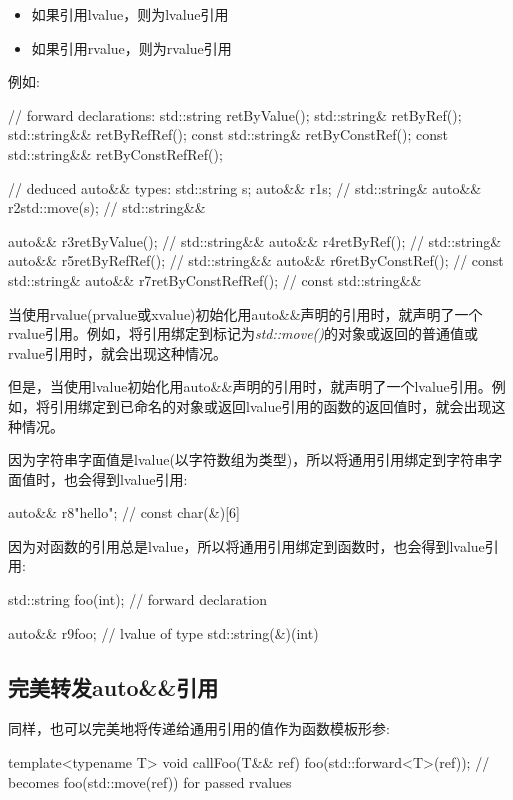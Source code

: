 \begin{itemize}
	\item 如果引用lvalue，则为lvalue引用
	\item 如果引用rvalue，则为rvalue引用
\end{itemize}

例如:

\begin{cppcode}
// forward declarations:
std::string retByValue();
std::string& retByRef();
std::string&& retByRefRef();
const std::string& retByConstRef();
const std::string&& retByConstRefRef();

// deduced auto&& types:
std::string s;
auto&& r1{s}; // std::string&
auto&& r2{std::move(s)}; // std::string&&

auto&& r3{retByValue()}; // std::string&&
auto&& r4{retByRef()}; // std::string&
auto&& r5{retByRefRef()}; // std::string&&
auto&& r6{retByConstRef()}; // const std::string&
auto&& r7{retByConstRefRef()}; // const std::string&&
\end{cppcode}

当使用rvalue(prvalue或xvalue)初始化用auto\&\&声明的引用时，就声明了一个rvalue引用。例如，将引用绑定到标记为\textit{std::move()}的对象或返回的普通值或rvalue引用时，就会出现这种情况。

但是，当使用lvalue初始化用auto\&\&声明的引用时，就声明了一个lvalue引用。例如，将引用绑定到已命名的对象或返回lvalue引用的函数的返回值时，就会出现这种情况。

因为字符串字面值是lvalue(以字符数组为类型)，所以将通用引用绑定到字符串字面值时，也会得到lvalue引用:

\begin{cppcode}
auto&& r8{"hello"}; // const char(&)[6]
\end{cppcode}

因为对函数的引用总是lvalue，所以将通用引用绑定到函数时，也会得到lvalue引用:

\begin{cppcode}
std::string foo(int); // forward declaration

auto&& r9{foo}; // lvalue of type std::string(&)(int)
\end{cppcode}

\subsection{完美转发auto\&\&引用}

同样，也可以完美地将传递给通用引用的值作为函数模板形参:

\begin{cppcode}
template<typename T>
void callFoo(T&& ref) {
	foo(std::forward<T>(ref)); // becomes foo(std::move(ref)) for passed rvalues
}
\end{cppcode}

